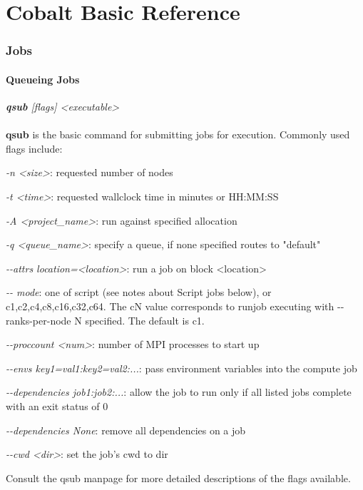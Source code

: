 \documentclass[12pt,letterpaper]{article}
\begin{document}
\part*{Cobalt Basic Reference}
\section*{Jobs}
\subsection*{Queueing Jobs}
\textit{\textbf{qsub} [flags] \textless executable\textgreater {}}
\\
\\
\textbf{qsub} is the basic command for submitting jobs for execution.  Commonly used flags include:
\begin{list}{}{}
\item \textit{-n \textless size\textgreater}: requested number of nodes
\item \textit{-t \textless time\textgreater}: requested wallclock time in minutes or HH:MM:SS
\item \textit{-A \textless project\_name\textgreater}:  run against specified allocation
\item \textit{-q \textless queue\_name\textgreater}: specify a queue, if none specified routes to "default"
\item \textit{-\--attrs location=\textless location\textgreater}: run a job on block \textless location\textgreater
\item \textit{-\-- mode}: one of script (see notes about Script jobs below), or c1,c2,c4,c8,c16,c32,c64.  The cN value corresponds to runjob executing with -\--ranks-per-node N specified.  The default is c1.  
\item \textit{-\--proccount \textless num\textgreater}: number of MPI processes to start up
\item \textit{-\--envs key1=val1:key2=val2:...}: pass environment variables into the compute job
\item \textit{-\--dependencies job1:job2:...}: allow the job to run only if all listed 
    jobs complete with an exit status of 0
\item \textit{-\--dependencies None}: remove all dependencies on a job
\item \textit{-\--cwd \textless dir\textgreater}: set the job's cwd to dir
\end{list}
Consult the qsub manpage for more detailed descriptions of the flags available.
\end{document}
